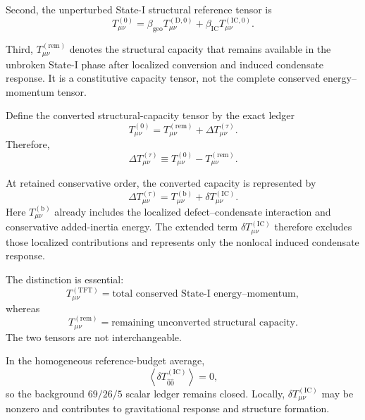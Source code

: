 Second, the unperturbed State-I structural reference tensor is
\begin{equation}
    T_{\mu\nu}^{(0)} = \beta_{\mathrm{geo}} T_{\mu\nu}^{(\mathrm{D},0)} + \beta_{\mathrm{IC}} T_{\mu\nu}^{(\mathrm{IC},0)}.
\end{equation}

Third, $T_{\mu\nu}^{(\mathrm{rem})}$ denotes the structural capacity that remains available in the unbroken State-I phase after localized conversion and induced condensate response. It is a constitutive capacity tensor, not the complete conserved energy--momentum tensor.

Define the converted structural-capacity tensor by the exact ledger
\begin{equation}
    T_{\mu\nu}^{(0)} = T_{\mu\nu}^{(\mathrm{rem})} + \Delta T_{\mu\nu}^{(\tau)}.
\end{equation}
Therefore,
\begin{equation}
    \Delta T_{\mu\nu}^{(\tau)} \equiv T_{\mu\nu}^{(0)} - T_{\mu\nu}^{(\mathrm{rem})}.
\end{equation}

At retained conservative order, the converted capacity is represented by
\begin{equation}
    \Delta T_{\mu\nu}^{(\tau)} = T_{\mu\nu}^{(\mathrm{b})} + \delta T_{\mu\nu}^{(\mathrm{IC})}.
\end{equation}
Here $T_{\mu\nu}^{(\mathrm{b})}$ already includes the localized defect--condensate interaction and conservative added-inertia energy. The extended term $\delta T_{\mu\nu}^{(\mathrm{IC})}$ therefore excludes those localized contributions and represents only the nonlocal induced condensate response.

The distinction is essential:
\begin{equation}
    T_{\mu\nu}^{(\mathrm{TFT})} = \text{total conserved State-I energy--momentum},
\end{equation}
whereas
\begin{equation}
    T_{\mu\nu}^{(\mathrm{rem})} = \text{remaining unconverted structural capacity}.
\end{equation}
The two tensors are not interchangeable.

In the homogeneous reference-budget average,
\begin{equation}
    \left\langle \delta T_{\hat{0}\hat{0}}^{(\mathrm{IC})} \right\rangle = 0,
\end{equation}
so the background $69/26/5$ scalar ledger remains closed. Locally, $\delta T_{\mu\nu}^{(\mathrm{IC})}$ may be nonzero and contributes to gravitational response and structure formation.

